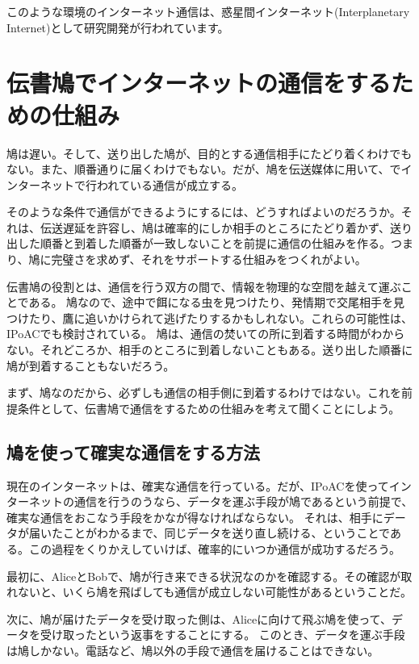 このような環境のインターネット通信は、惑星間インターネット(Interplanetary Internet)として研究開発が行われています。


\section{伝書鳩でインターネットの通信をするための仕組み}
鳩は遅い。そして、送り出した鳩が、目的とする通信相手にたどり着くわけでもない。また、順番通りに届くわけでもない。だが、鳩を伝送媒体に用いて、でインターネットで行われている通信が成立する。

そのような条件で通信ができるようにするには、どうすればよいのだろうか。それは、伝送遅延を許容し、鳩は確率的にしか相手のところにたどり着かず、送り出した順番と到着した順番が一致しないことを前提に通信の仕組みを作る。つまり、鳩に完璧さを求めず、それをサポートする仕組みをつくれがよい。

伝書鳩の役割とは、通信を行う双方の間で、情報を物理的な空間を越えて運ぶことである。
鳩なので、途中で餌になる虫を見つけたり、発情期で交尾相手を見つけたり、鷹に追いかけられて逃げたりするかもしれない。これらの可能性は、IPoACでも検討されている。
鳩は、通信の焚いての所に到着する時間がわからない。それどころか、相手のところに到着しないこともある。送り出した順番に鳩が到着することもないだろう。

まず、鳩なのだから、必ずしも通信の相手側に到着するわけではない。これを前提条件として、伝書鳩で通信をするための仕組みを考えて聞くことにしよう。


\subsection{鳩を使って確実な通信をする方法}

現在のインターネットは、確実な通信を行っている。だが、IPoACを使ってインターネットの通信を行うのうなら、データを運ぶ手段が鳩であるという前提で、確実な通信をおこなう手段をかなが得なければならない。
それは、相手にデータが届いたことがわかるまで、同じデータを送り直し続ける、ということである。この過程をくりかえしていけば、確率的にいつか通信が成功するだろう。


最初に、AliceとBobで、鳩が行き来できる状況なのかを確認する。その確認が取れないと、いくら鳩を飛ばしても通信が成立しない可能性があるということだ。

次に、鳩が届けたデータを受け取った側は、Aliceに向けて飛ぶ鳩を使って、データを受け取ったという返事をすることにする。
このとき、データを運ぶ手段は鳩しかない。電話など、鳩以外の手段で通信を届けることはできない。


